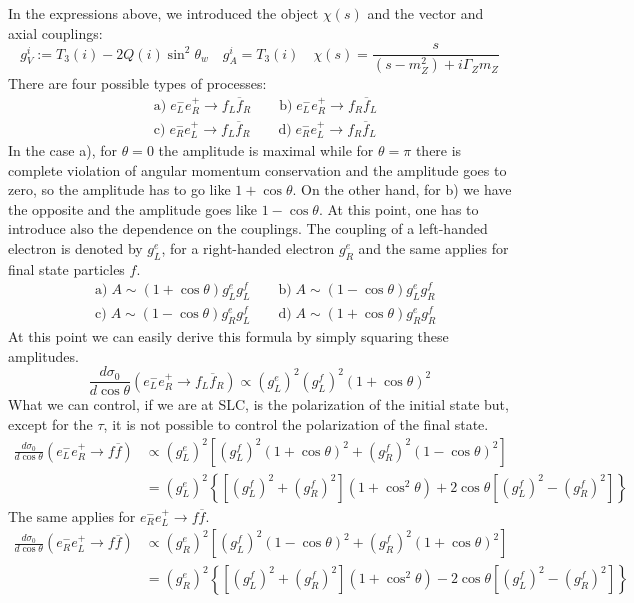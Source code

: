 \documentclass[../main.tex]{subfiles}
\begin{document}
In the expressions above, we introduced the object $\chi(s)$ and the vector and axial couplings:
\[
g_V^i:=T_3(i)-2Q(i)\sin^2\theta_w \quad g_A^i=T_3(i) \quad \chi(s)=\frac{s}{(s-m_Z^2)+i\Gamma_Zm_Z}
\]
There are four possible types of processes:
\[
\begin{aligned}
&\text{a)}\;e_L^-e_R^+\to f_L\overline{f}_R \qquad \text{b)}\; e_L^-e_R^+\to f_R\overline{f}_L\\
&\text{c)}\; e_R^-e_L^+\to f_L\overline{f}_R \qquad
\text{d)}\; e_R^-e_L^+\to f_R\overline{f}_L
\end{aligned}
\]
In the case a), for $\theta=0$ the amplitude is maximal while for $\theta=\pi$ there is complete violation of angular momentum conservation and the amplitude goes to zero, so the amplitude has to go like $1+\cos\theta$. On the other hand, for b) we have the opposite and the amplitude goes like $1-\cos\theta$. At this point, one has to introduce also the dependence on the couplings. The coupling of a left-handed electron is denoted by $g_L^e$, for a right-handed electron $g_R^e$ and the same applies for final state particles $f$.
\[
\begin{aligned}
&\text{a)}\;A\sim(1+\cos\theta)g_L^eg_L^f \qquad \text{b)}\; A\sim(1-\cos\theta)g_L^eg_R^f\\
&\text{c)}\; A\sim(1-\cos\theta)g_R^eg_L^f \qquad
\text{d)}\; A\sim(1+\cos\theta)g_R^eg_R^f
\end{aligned}
\]
At this point we can easily derive this formula by simply squaring these amplitudes.
\[
\frac{d\sigma_0}{d\cos\theta}(e_L^-e_R^+\to f_L\overline{f}_R)\propto(g_L^e)^2(g_L^f)^2(1+\cos\theta)^2
\]
What we can control, if we are at SLC, is the polarization of the initial state but, except for the $\tau$, it is not possible to control the polarization of the final state. 
\[
\begin{aligned}
\frac{d\sigma_0}{d\cos\theta}(e_L^-e_R^+\to f\overline{f})&\propto(g_L^e)^2\left[(g_L^f)^2(1+\cos\theta)^2+(g_R^f)^2(1-\cos\theta)^2\right]\\
&=(g_L^e)^2\left\{[(g_L^f)^2+(g_R^f)^2](1+\cos^2\theta)+2\cos\theta[(g_L^f)^2-(g_R^f)^2]\right\}
\end{aligned}
\]
The same applies for $e_R^-e_L^+\to f\overline{f}$.
\[
\begin{aligned}
\frac{d\sigma_0}{d\cos\theta}(e_R^-e_L^+\to f\overline{f})&\propto(g_R^e)^2\left[(g_L^f)^2(1-\cos\theta)^2+(g_R^f)^2(1+\cos\theta)^2\right]\\
&=(g_R^e)^2\left\{[(g_L^f)^2+(g_R^f)^2](1+\cos^2\theta)-2\cos\theta[(g_L^f)^2-(g_R^f)^2]\right\}
\end{aligned}
\]
\end{document}
